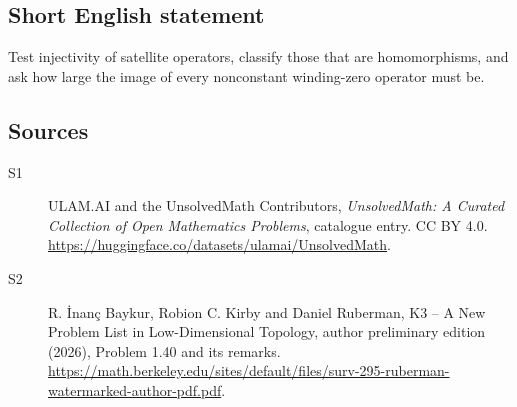 \documentclass[11pt]{article}
\begin{document}
\subsection{Short English statement}
Test injectivity of satellite operators, classify those that are homomorphisms, and ask how large the image of every nonconstant winding-zero operator must be.
\subsection{Sources}
\begin{description}
\item[\hypertarget{source:statement:1}{S1}] ULAM.AI and the UnsolvedMath Contributors, \emph{UnsolvedMath: A Curated Collection of Open Mathematics Problems}, catalogue entry. CC BY 4.0. \url{https://huggingface.co/datasets/ulamai/UnsolvedMath}.
\item[\hypertarget{source:statement:2}{S2}] R. \.{I}nan\c{c} Baykur, Robion C. Kirby and Daniel Ruberman, K3 -- A New Problem List in Low-Dimensional Topology, author preliminary edition (2026), Problem 1.40 and its remarks. \url{https://math.berkeley.edu/sites/default/files/surv-295-ruberman-watermarked-author-pdf.pdf}.
\end{description}
\label{end:statement}
\end{document}
